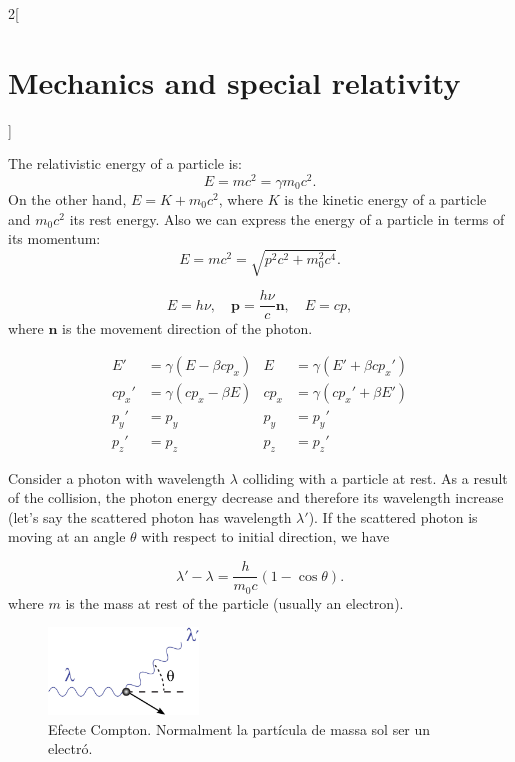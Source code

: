 \documentclass[class=article,10pt,crop=false]{standalone}
\begin{document}
\begin{multicols}{2}[\section{Mechanics and special relativity}]
\begin{concept}
The relativistic energy of a particle is: $$E=mc^2=\gamma m_0c^2.$$ On the other hand, $E=K+m_0c^2$, where $K$ is the kinetic energy of a particle and $m_0c^2$ its rest energy. Also we can express the energy of a particle in terms of its momentum:
$$E=mc^2=\sqrt{p^2c^2+m_0^2c^4}.$$
\end{concept}
\begin{concept}
$$E=h\nu,\quad\boldsymbol{p}=\frac{h\nu}{c}\boldsymbol{n},\quad E=cp,$$ where $\boldsymbol{n}$ is the movement direction of the photon.
\end{concept}
\begin{concept}
\begin{align*}
    E'&=\gamma(E-\beta cp_x) & E&=\gamma(E'+\beta cp_x')\\
    cp_x'&=\gamma(cp_x-\beta E) & cp_x&=\gamma(cp_x'+\beta E')\\
    p_y'&=p_y & p_y&=p_y'\\
    p_z'&=p_z & p_z&=p_z'
\end{align*}
\end{concept}
\begin{concept}
Consider a photon with wavelength $\lambda$ colliding with a particle at rest. As a result of the collision, the photon energy decrease and therefore its wavelength increase (let's say the scattered photon has wavelength $\lambda'$). If the scattered photon is moving at an angle $\theta$ with respect to initial direction, we have
\end{concept}
$$\lambda'-\lambda=\frac{h}{m_0c}(1-\cos\theta).$$
where $m$ is the mass at rest of the particle (usually an electron).
\begin{figure}[ht]
    \centering
    \includegraphics[width=4cm]{Physics/1st/Mechanics_and_special_relativity/Images/comp.jpg}
    \caption{Efecte Compton. Normalment la par\-tí\-cu\-la de massa sol ser un electró.}
\end{figure}

\end{multicols}
\end{document}
